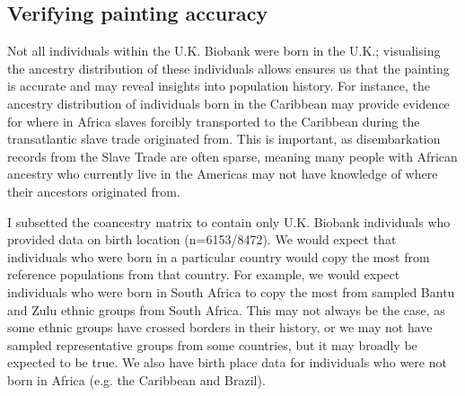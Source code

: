 \subsection{Verifying painting accuracy} 
 
Not all individuals within the U.K. Biobank were born in the U.K.; visualising the ancestry distribution of these individuals allows ensures us that the painting is accurate and may reveal insights into population history. For instance, the ancestry distribution of individuals born in the Caribbean may provide evidence for where in Africa slaves forcibly transported to the Caribbean during the transatlantic slave trade originated from. This is important, as disembarkation records from the Slave Trade are often sparse, meaning many people with African ancestry who currently live in the Americas may not have knowledge of where their ancestors originated from.

I subsetted the coancestry matrix to contain only U.K. Biobank individuals who provided data on birth location (n=6153/8472). We would expect that individuals who were born in a particular country would copy the most from reference populations from that country. For example, we would expect individuals who were born in South Africa to copy the most from sampled Bantu and Zulu ethnic groups from South Africa. This may not always be the case, as some ethnic groups have crossed borders in their history,  or we may not have sampled representative groups from some countries, but it may broadly be expected to be true. We also have birth place data for individuals who were not born in Africa (e.g. the Caribbean and Brazil). 

